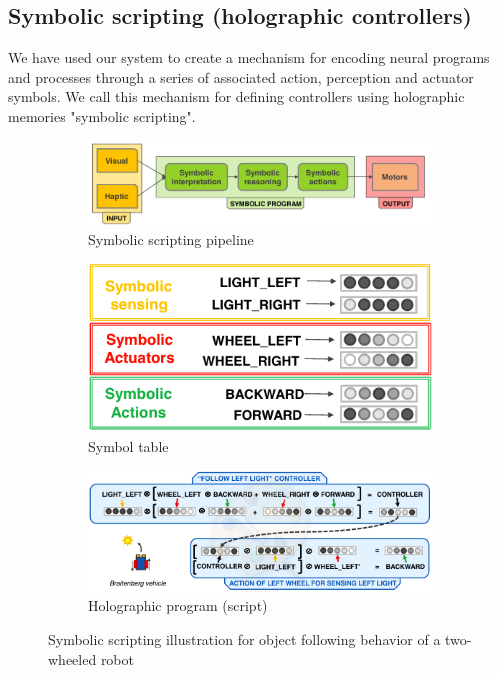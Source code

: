 \documentclass[journal]{journal}
\begin{document}
	

		\label{fig:visual-scene-exp}
	
\subsection{Symbolic scripting (holographic controllers)}

We have used our system to create a mechanism for encoding neural programs and processes through a series of associated action, perception and actuator symbols. We call this mechanism for defining controllers using holographic memories "symbolic scripting".


\begin{figure}[th!]
	\center
	\begin{subfigure}{1\columnwidth}
		\includegraphics[width=\columnwidth]{img/control_pipeline.png}
		\caption{Symbolic scripting pipeline}
		\label{fig:symbolic-scripting-a}
	\end{subfigure}
	
	
	\begin{subfigure}{0.7\columnwidth}
		\center
		\includegraphics[width=\columnwidth]{img/symbol_table.png}
		\caption{Symbol table}
		\label{fig:symbolic-scripting-b}
	\end{subfigure}
	\begin{subfigure}{1\columnwidth}
		\includegraphics[width=\columnwidth]{img/controller.png}
		\caption{Holographic program (script)}
		\label{fig:symbolic-scripting-c}
	\end{subfigure}
	\caption{Symbolic scripting illustration for object following behavior of a two-wheeled robot}
	\label{fig:symbolic-scripting}
\end{figure}
\end{document}
